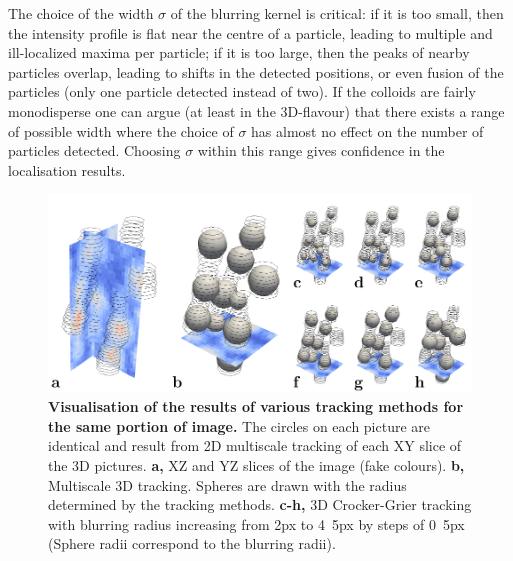 \documentclass[prl,twocolumn,notitlepage]{revtex4-1}
\begin{document}
The choice of the width $\sigma$ of the blurring kernel is critical: if it is too small, then the intensity profile is flat near the centre  of a particle, leading to multiple and ill-localized maxima per particle; if it is too large, then the peaks of nearby particles overlap, leading to shifts in the detected positions, or even fusion of the particles (only one particle detected instead of two). If the colloids are fairly monodisperse one can argue (at least in the 3D-flavour) that there exists a range of possible width where the choice of $\sigma$ has almost no effect on the number of particles detected. Choosing $\sigma$ within this range gives confidence in the localisation results.

\begin{figure}
\begin{center}
\includegraphics{generate_figures-figure5.pdf}
\end{center}
\caption{\textbf{Visualisation of the results of various tracking methods for the same portion of image.} The circles on each picture are identical and result from 2D multiscale tracking of each XY slice of the 3D pictures. \textbf{a,} XZ and YZ slices of the image (fake colours). \textbf{b,} Multiscale 3D tracking. Spheres are drawn with the radius determined by the tracking methods. \textbf{c-h,} 3D Crocker-Grier tracking with blurring radius increasing from \unit{2}{px} to \unit{4.5}{px} by steps of \unit{0.5}{px} (Sphere radii correspond to the blurring radii).}
	\label{fig:localise}
\end{figure}
\end{document}
